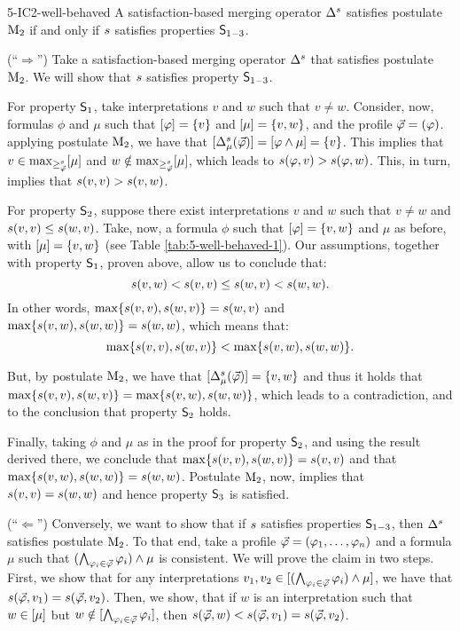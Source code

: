 \begin{thm}{}{5-IC2-well-behaved}
	A satisfaction-based merging operator $\me^\sat$ satisfies postulate $\ppm{2}$
	if and only if $\sat$ satisfies properties $\SM{1-3}$.
\end{thm}
\begin{prf*}{}{}%
	(``$\Rightarrow$'')
	Take a satisfaction-based merging operator $\mer{\sat}{}$ that satisfies postulate $\ppm{2}$.
	We will show that $\sat$ satisfies property $\SM{1-3}$.
	
	For property $\SM{1}$, take interpretations $v$ and $w$ such that $v\neq w$.
	Consider, now, formulas $\phi$ and $\mu$ such that $\mods{\phi}=\set{v}$ and $\mods{\mu}=\set{v,w}$,
	and the profile $\P=(\phi)$.
	applying postulate $\ppm{2}$, we have that $\mods{\mer{\sat}{\mu}(\P)}=\mods{\phi\land\mu}=\set{v}$.
	This implies that $v\in\max_{\ge^{\sat}_{\P}}[\mu]$ 
	and $w\notin\max_{\ge^{\sat}_{\P}}[\mu]$,
	which leads to 
	$\sat(\phi,v)>\sat(\phi,w)$.
	This, in turn, implies that
	$\sat(v,v)>\sat(v,w)$.
	
	For property $\SM{2}$, suppose there exist interpretations $v$ and $w$ such that 
	$v\neq w$ and $\sat(v,v)\leq\sat(w,v)$.
	Take, now, a formula $\phi$ such that $\mods{\phi}=\set{v,w}$
	and $\mu$ as before, with $\mods{\mu}=\set{v,w}$ (see Table \ref{tab:5-well-behaved-1}).
	Our assumptions, together with property $\SM{1}$, proven above, allow us to conclude that:
	$$
		\sat(v,w)<\sat(v,v)\leq\sat(w,v)<\sat(w,w).
	$$
	In other words, $\max\set{\sat(v,v),\sat(w,v)} = \sat(w,v)$
	and $\max\set{\sat(v,w),\sat(w,w)}=\sat(w,w)$,
	which means that:
	$$
		\max\set{\sat(v,v),\sat(w,v)} < \max\set{\sat(v,w),\sat(w,w)}.
	$$
	
	But, by postulate $\ppm{2}$, we have that $\mods{\mer{\sat}{\mu}(\P)}=\set{v,w}$
	and thus it holds that $\max\set{\sat(v,v),\sat(w,v)} = \max\set{\sat(v,w),\sat(w,w)}$,
	which leads to a contradiction, and to the conclusion that property $\SM{2}$ holds.
	
	Finally, taking $\phi$ and $\mu$ as in the proof for property $\SM{2}$,
	and using the result derived there,
	we conclude that $\max\set{\sat(v,v),\sat(w,v)} = \sat(v,v)$
	and that $\max\set{\sat(v,w),\sat(w,w)}=\sat(w,w)$.
	Postulate $\ppm{2}$, now, implies that $\sat(v,v)=\sat(w,w)$
	and hence property $\SM{3}$ is satisfied.
	
	(``$\Leftarrow$'')	
	Conversely, we want to show that if $\sat$ satisfies properties $\SM{1-3}$,
	then $\mer{\sat}{}$ satisfies postulate $\ppm{2}$.
	To that end, take a profile $\P=(\phi_1,\dots,\phi_n)$
	and a formula $\mu$ such that $(\bigwedge_{\phi_i\in\P}\phi_i)\land\mu$ is consistent.
	We will prove the claim in two steps.
	First, we show that for any interpretations $v_1,v_2\in\mods{(\bigwedge_{\phi_i\in\P}\phi_i)\land\mu}$,
	we have that $\sat(\P,v_1)=\sat(\P,v_2)$.
	Then, we show, that if $w$ is an interpretation such that $w\in\mods{\mu}$ 
	but $w\notin\mods{\bigwedge_{\phi_i\in\P}\phi_i}$, 
	then $\sat(\P,w)<\sat(\P,v_1)=\sat(\P,v_2)$.
	

\end{prf*}
